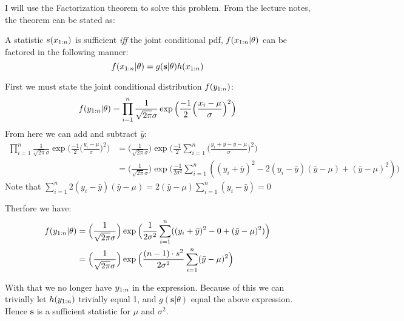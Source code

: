 
I will use the Factorization theorem to solve this problem. 
From the lecture notes, the theorem can be stated as:

\begin{tcolorbox}
    A statistic $s(x_{1:n})$ is sufficient \textit{iff} the joint conditional pdf, $f(x_{1:n}\vert\theta)$ can be factored in the following manner:
    \begin{equation*}
        f(x_{1:n}|\theta) = g(\mathbf{s}\vert \theta) h(x_{1:n})
    \end{equation*}
\end{tcolorbox}

First we must state the joint conditional distribution $f(y_{1:n})$:
\begin{equation*}
    f(y_{1:n}|\theta) = \prod_{i=1}^n \frac{1}{\sqrt{2\pi}\sigma}\exp{\Big(\frac{-1}{2}\Big(\frac{x_i - \mu}{\sigma}\Big)^2\Big)}
\end{equation*}
From here we can add and subtract $\bar{y}$:
\begin{align*}
    \prod_{i=1}^n \frac{1}{\sqrt{2\pi}\sigma}\exp{\Big(\frac{-1}{2}\Big(\frac{y_i - \mu}{\sigma}\Big)^2\Big)} 
    &= \Big(\frac{1}{\sqrt{2\pi}\sigma}\Big)\exp{\Big(\frac{-1}{2}\sum_{i=1}^n\Big(\frac{y_i +\bar{y} -\bar{y} - \mu}{\sigma}\Big)^2\Big)} \\
    &= \Big(\frac{1}{\sqrt{2\pi}\sigma}\Big)\exp{
        \Big(\frac{-1}{2\sigma^2}\sum_{i=1}^n
                                ((y_i +\bar{y})^2 -2(y_i -\bar{y})(\bar{y} - \mu)+(\bar{y} - \mu)^2)\Big)} 
\end{align*}
Note that $\sum_{i=1}^n 2(y_i -\bar{y})(\bar{y} - \mu) = 2(\bar{y} - \mu)\sum_{i=1}^n (y_i -\bar{y}) = 0$

Therfore we have: 
\begin{align*}
    f(y_{1:n} | \theta) 
    &= \Big(\frac{1}{\sqrt{2\pi}\sigma}\Big)\exp{
        \Big(\frac{1}{2\sigma^2}\sum_{i=1}^n
    ((y_i +\bar{y})^2 -0 +(\bar{y} - \mu)^2)\Big)} \\
    &= \Big(\frac{1}{\sqrt{2\pi}\sigma}\Big)\exp{
        \Big(\frac{(n-1)\cdot s^2}{2\sigma^2}\sum_{i=1}^n
                (\bar{y} - \mu)^2}\Big)\\ 
\end{align*}

With that we no longer have $y_{1:n}$ in the expression.
Because of this we can trivially let $h(y_{1:n})$ trivially equal 1, and $g(\mathbf{s}\vert \theta)$ equal the above expression.
Hence $\mathbf{s}$ is a sufficient statistic for $\mu$ and $\sigma^2$.
